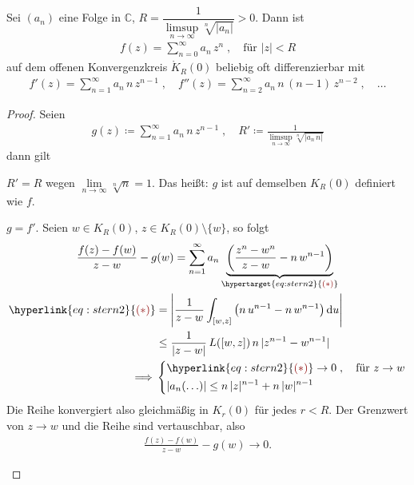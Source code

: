 \documentclass[a4paper,10pt]{scrbook}
\begin{document}
\begin{theorem}[Satz] \label{thm:1.35}
  Sei $(a_n)$ eine Folge in $\mathbb{C}$, $R = \dfrac{1}{\limsup\limits_{n \to \infty} \sqrt[n]{|a_n|}} > 0$.
  Dann ist
  \begin{align*}
    f(z) = \sum\limits_{n=0}^{\infty} a_n \, z^n \; , \quad \text{für } |z| < R
  \end{align*}
  auf dem offenen Konvergenzkreis $\mathring{K}_R(0)$ beliebig oft differenzierbar mit
  \begin{align*}
    f'(z) = \sum\limits_{n=1}^{\infty} a_n \, n \, z^{n-1} \; , \quad
    f''(z) = \sum\limits_{n=2}^{\infty} a_n \, n \, (n-1) \, z^{n-2} \; , \quad \ldots
  \end{align*}

  \begin{proof} Seien
    \begin{align*}
      g(z) \coloneq \sum\limits_{n=1}^{\infty} a_n \, n \, z^{n-1} \; , \quad R' \coloneq \frac{1}{\limsup\limits_{n \to \infty} \sqrt[n]{|a_n \, n|}}
    \end{align*}
    dann gilt
    \begin{enum-arab}
      \item $R' = R$ wegen $\lim\limits_{n \to \infty} \sqrt[n]{n} = 1$. Das heißt: $g$ ist auf demselben $K_R(0)$ definiert wie $f$.

      \item $g = f'$. Seien $w \in K_R(0)$, $z \in K_R(0) \setminus \{w\}$, so folgt
      \begin{gather*}
        \frac{f(z) - f(w)}{z - w} - g(w) = \sum\limits_{n = 1}^{\infty} a_n \underbrace{\left( \frac{z^n - w^n}{z - w} - n \, w^{n-1} \right)}_{{\hypertarget{eq:stern2}{{\color{DarkRed} (\ast)}}}} \\
        \begin{aligned}
          {\hyperlink{eq:stern2}{{\color{DarkRed} (\ast)}}} &= \left| \frac{1}{z - w} \int_{[w,z]} \left( n \, u^{n-1} - n \, w^{n-1} \right) \mathrm{d}u \right| \\
          &\leq \frac{1}{|z-w|} \, L([w,z]) \, n \, |z^{n-1} - w^{n-1}| \\
          \implies &
          \begin{dcases}
            {\hyperlink{eq:stern2}{{\color{DarkRed} (\ast)}}} \to 0 \; , \quad \text{für } z \to w \\
            |a_n(\ldots)| \leq n \, |z|^{n-1} + n \, |w|^{n-1}
          \end{dcases}
        \end{aligned}
      \end{gather*}
      Die Reihe konvergiert also gleichmäßig in $K_r(0)$ für jedes $r < R$. Der Grenzwert von $z \to w$ und die Reihe sind vertauschbar, also
      \begin{align*}
        \frac{f(z) - f(w)}{z - w} - g(w) \to 0.
      \end{align*}
    \end{enum-arab}
  \end{proof}
\end{theorem}
\end{document}
